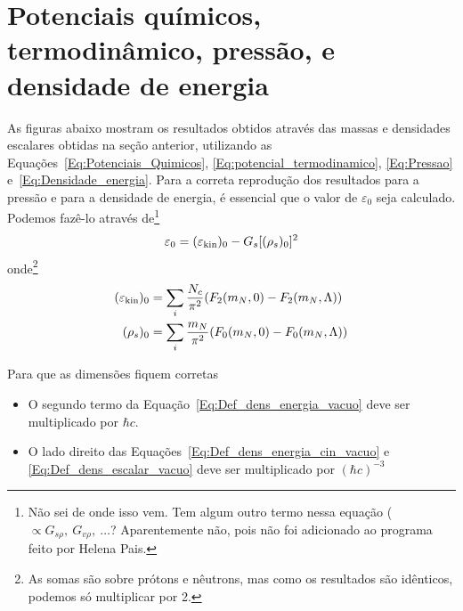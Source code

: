 \begin{figure*}
	
	\caption{Gráfico da densidade escalar em função da densidade bariônica para fração de prótons 1/2. O resultado mostrado nesse gráfico é obtido juntamente com os resultados mostrados na Fig.~\ref{Fig:mass_graph} através da solução da Equação~\ref{Eq:Gap_zero}. \protect}
	\label{Fig:scalar_density_graph}
\end{figure*}

\FloatBarrier
\section{Potenciais químicos, termodinâmico, pressão, e densidade de energia}

As figuras abaixo mostram os resultados obtidos através das massas e densidades escalares obtidas na seção anterior, utilizando as Equações~\eqref{Eq:Potenciais_Quimicos}, \eqref{Eq:potencial_termodinamico}, \eqref{Eq:Pressao} e~\eqref{Eq:Densidade_energia}. Para a correta reprodução dos resultados para a pressão e para a densidade de energia, é essencial que o valor de $\varepsilon_0$ seja calculado. Podemos fazê-lo através de\footnote{Não sei de onde isso vem. Tem algum outro termo nessa equação ($\propto G_{s\rho},~G_{v\rho},~\dots$? Aparentemente não, pois não foi adicionado ao programa feito por Helena Pais.}
\begin{equation}\label{Eq:Def_dens_energia_vacuo}
	\varepsilon_0 = (\varepsilon_{\rm{kin}})_0 - G_s [(\rho_s)_0]^2
\end{equation}
%
onde\footnote{As somas são sobre prótons e nêutrons, mas como os resultados são idênticos, podemos só multiplicar por 2.}
\begin{align}
	(\varepsilon_{\rm{kin}})_0 &= \sum_i \frac{N_c}{\pi^2} (F_2(m_N,0) - F_2(m_N, \Lambda)) \label{Eq:Def_dens_energia_cin_vacuo}\\
	(\rho_s)_0 &= \sum_i \frac{m_N}{\pi^2} (F_0(m_N, 0) - F_0(m_N, \Lambda)) \label{Eq:Def_dens_escalar_vacuo}
\end{align}

Para que as dimensões fiquem corretas
\begin{itemize}
	\item O segundo termo da Equação~\eqref{Eq:Def_dens_energia_vacuo} deve ser multiplicado por $\hbar c$.
	\item O lado direito das Equações~\eqref{Eq:Def_dens_energia_cin_vacuo} e \eqref{Eq:Def_dens_escalar_vacuo} deve ser multiplicado por $(\hbar c)^{-3}$
\end{itemize}

